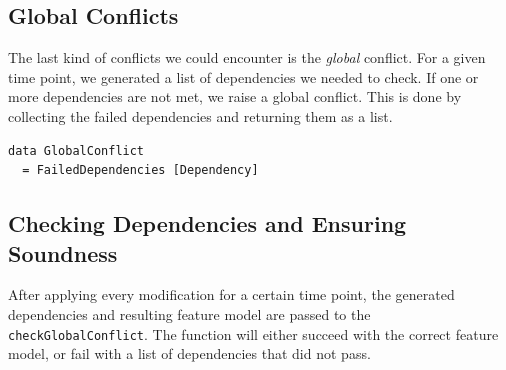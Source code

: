 \documentclass[a4paper,english]{ifimaster}
\begin{document}
\subsection{Global Conflicts}%
\label{sub:global_conflicts}

The last kind of conflicts we could encounter is the \textit{global} conflict. For a given time point, we generated a list of dependencies we needed to check. If one or more dependencies are not met, we raise a global conflict. This is done by collecting the failed dependencies and returning them as a list.

\begin{verbatim}
data GlobalConflict
  = FailedDependencies [Dependency]
\end{verbatim}

\subsection{Checking Dependencies and Ensuring Soundness}%
\label{sub:checking_dependencies_and_ensuring_soundness}

After applying every modification for a certain time point, the generated dependencies and resulting feature model are passed to the \texttt{check\-Global\-Conflict}. The function will either succeed with the correct feature model, or fail with a list of dependencies that did not pass.
\end{document}
